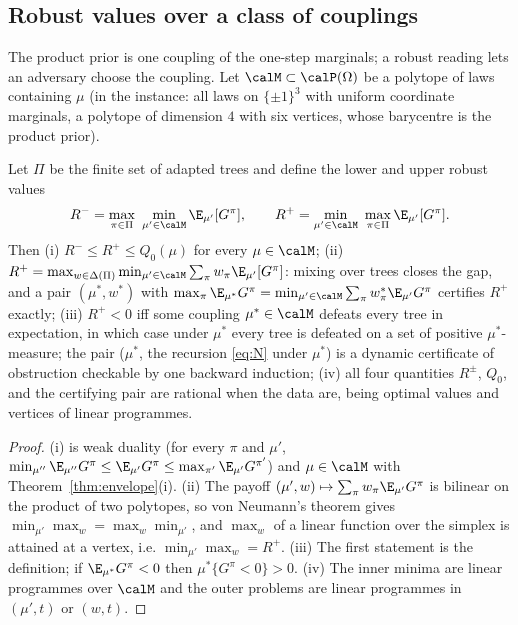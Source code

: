 \subsection{Robust values over a class of couplings}

The product prior is one coupling of the one-step marginals; a robust reading lets an adversary choose the coupling. Let $\calM\subset\calP(\Omega)$ be a polytope of laws containing $\mu$ (in the instance: all laws on $\{\pm1\}^3$ with uniform coordinate marginals, a polytope of dimension $4$ with six vertices, whose barycentre is the product prior).

\begin{proposition}\label{prop:robust}
Let $\Pi$ be the finite set of adapted trees and define the lower and upper robust values
\begin{equation}\label{eq:robust}
R^-=\max_{\pi\in\Pi}\ \min_{\mu'\in\calM}\E_{\mu'}[G^\pi],\qquad R^+=\min_{\mu'\in\calM}\ \max_{\pi\in\Pi}\E_{\mu'}[G^\pi].
\end{equation}
Then (i) $R^-\le R^+\le Q_0(\mu)$ for every $\mu\in\calM$; (ii) $R^+=\max_{w\in\Delta(\Pi)}\min_{\mu'\in\calM}\sum_\pi w_\pi\E_{\mu'}[G^\pi]$: mixing over trees closes the gap, and a pair $(\mu^\ast,w^\ast)$ with $\max_\pi\E_{\mu^\ast}G^\pi=\min_{\mu'\in\calM}\sum_\pi w^\ast_\pi\E_{\mu'}G^\pi$ certifies $R^+$ exactly; (iii) $R^+<0$ iff some coupling $\mu^\ast\in\calM$ defeats every tree in expectation, in which case under $\mu^\ast$ every tree is defeated on a set of positive $\mu^\ast$-measure; the pair ($\mu^\ast$, the recursion \eqref{eq:N} under $\mu^\ast$) is a dynamic certificate of obstruction checkable by one backward induction; (iv) all four quantities $R^\pm$, $Q_0$, and the certifying pair are rational when the data are, being optimal values and vertices of linear programmes.
\end{proposition}

\begin{proof}
(i) is weak duality (for every $\pi$ and $\mu'$, $\min_{\mu''}\E_{\mu''}G^\pi\le\E_{\mu'}G^\pi\le\max_{\pi'}\E_{\mu'}G^{\pi'}$) and $\mu\in\calM$ with Theorem~\ref{thm:envelope}(i). (ii) The payoff $(\mu',w)\mapsto\sum_\pi w_\pi\E_{\mu'}G^\pi$ is bilinear on the product of two polytopes, so von Neumann's theorem \cite{vonNeumann1928} gives $\min_{\mu'}\max_w=\max_w\min_{\mu'}$, and $\max_w$ of a linear function over the simplex is attained at a vertex, i.e. $\min_{\mu'}\max_w=R^+$. (iii) The first statement is the definition; if $\E_{\mu^\ast}G^\pi<0$ then $\mu^\ast\{G^\pi<0\}>0$. (iv) The inner minima are linear programmes over $\calM$ and the outer problems are linear programmes in $(\mu',t)$ or $(w,t)$.
\end{proof}

